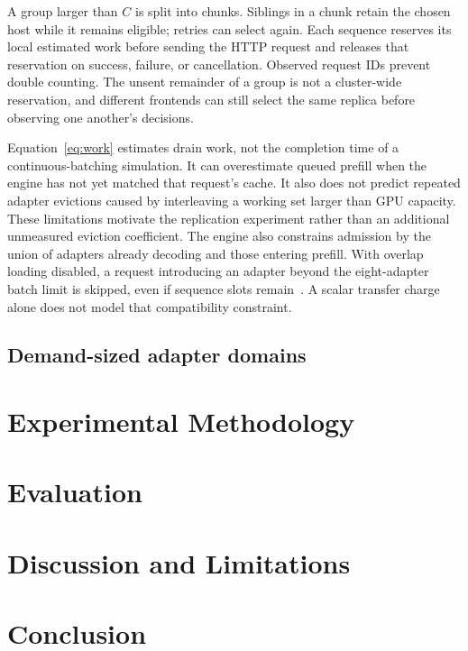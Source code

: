 \documentclass[10pt,twocolumn,letterpaper]{article}
\begin{document}
A group larger than $C$ is split into chunks. Siblings in a chunk retain the
chosen host while it remains eligible; retries can select again. Each sequence
reserves its local estimated work before sending the HTTP request and releases
that reservation on success, failure, or cancellation. Observed request IDs
prevent double counting. The unsent remainder of a group is not a cluster-wide
reservation, and different frontends can still select the same replica before
observing one another's decisions.

Equation~\ref{eq:work} estimates drain work, not the completion time of a
continuous-batching simulation. It can overestimate queued prefill when the
engine has not yet matched that request's cache. It also does not predict repeated
adapter evictions caused by interleaving a working set larger than GPU capacity.
These limitations motivate the replication experiment rather than an additional
unmeasured eviction coefficient.
The engine also constrains admission by the union of adapters already decoding
and those entering prefill. With overlap loading disabled, a request introducing
an adapter beyond the eight-adapter batch limit is skipped, even if sequence
slots remain~\cite{sglang-admission}. A scalar transfer charge alone does not
model that compatibility constraint.

\subsection{Demand-sized adapter domains}


\section{Experimental Methodology}

\section{Evaluation}

\FloatBarrier
\section{Discussion and Limitations}

\section{Conclusion}

\FloatBarrier
\end{document}
